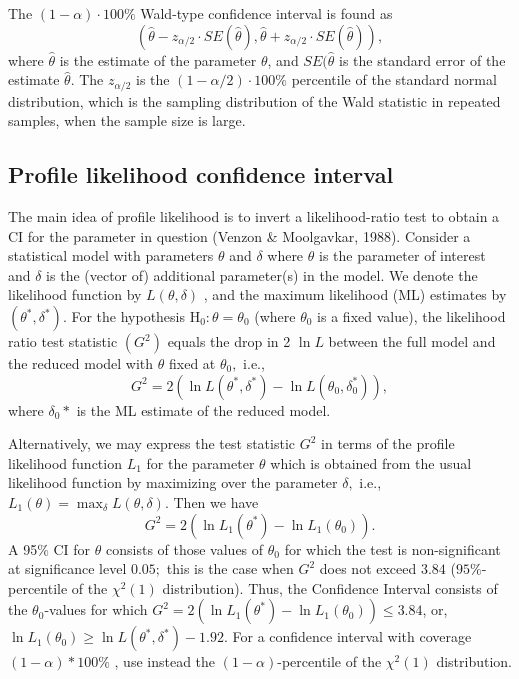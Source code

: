\documentclass[12pt,oneside,a4paper]{reedthesis}
\begin{document}
The \((1-\alpha) \cdot 100\%\) Wald-type confidence interval is found as
\begin{equation}
( \hat{\theta} - z_{\alpha /2} \cdot SE( \hat{\theta}),  \hat{\theta} + z_{\alpha /2} \cdot SE( \hat{\theta}) ),   
\end{equation}
where \(\hat{\theta}\) is the estimate of the parameter \(\theta\), and \(SE( \hat{\theta}\) is the standard error of the estimate \(\hat{\theta}\). The \(z_{\alpha /2}\) is the \((1-\alpha/2) \cdot 100\%\) percentile of the standard normal distribution, which is the sampling distribution of the Wald statistic in repeated samples, when the sample size is large.

\hypertarget{profile-likelihood-confidence-interval}{%
\subsection{Profile likelihood confidence interval}\label{profile-likelihood-confidence-interval}}

The main idea of profile likelihood is to invert a likelihood-ratio test to obtain a CI for the parameter in question (Venzon \& Moolgavkar, 1988). Consider a statistical model with parameters \(\theta\) and \(\delta\) where \(\theta\) is the parameter of interest and \(\delta\) is the (vector of) additional parameter(s) in the model. We denote the likelihood function by \(L(\theta, \delta)\) , and the maximum likelihood (ML) estimates by \(\left(\theta^{*}, \delta^{*}\right)\).
For the hypothesis \(\mathrm{H}_{0} : \theta=\theta_{0}\) (where \(\theta_{0}\) is a fixed value), the likelihood ratio test statistic \(\left(G^{2}\right)\) equals the drop in 2 \(\ln L\) between the full model and the reduced model with \(\theta\) fixed at \(\theta_{0},\) i.e.,
\begin{equation}
G^{2}=2\left(\ln L\left(\theta^{*}, \delta^{*}\right)-\ln L\left(\theta_{0}, \delta_{0}^{*}\right)\right),
\end{equation}
where \(\delta_{0} *\) is the ML estimate of the reduced model.

Alternatively, we may express the test statistic \(G^2\) in terms of the profile likelihood function \(L_{1}\) for the parameter \(\theta\) which is obtained from the usual likelihood function by maximizing over the parameter \(\delta,\) i.e., \(L_{1}(\theta)=\max _{\delta} L(\theta, \delta)\). Then we have
\begin{equation}
 G^{2}=2\left(\ln L_{1}\left(\theta^{*}\right)-\ln L_{1}\left(\theta_{0}\right)\right).  
\end{equation}
A 95\(\%\) CI for \(\theta\) consists of those values of \(\theta_{0}\) for which the test is non-significant at significance level \(0.05 ;\) this is the case when \(G^{2}\) does not exceed \(3.84\) (\(95\%\)-percentile of the \(\chi^{2}(1)\) distribution). Thus, the Confidence Interval consists of the \(\theta_{0}\)-values for which
\(G^2 = 2\left(\ln L_{1}\left(\theta^{*}\right)-\ln L_{1}\left(\theta_{0}\right)\right) \leq 3.84\),
or, \(\ln L_{1}\left(\theta_{0}\right) \geq \ln L\left(\theta^{*}, \delta^{*}\right)-1.92\).
For a confidence interval with coverage \((1-\alpha) * 100 \%\) , use instead the \((1-\alpha)\)-percentile of the \(\chi^{2}(1)\) distribution.
\end{document}
